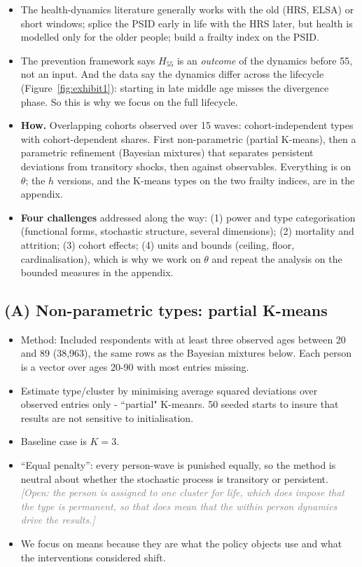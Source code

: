 \documentclass[11pt]{article}
\newcommand{\note}[1]{\textcolor{gray}{\textit{[#1]}}}
\begin{document}
	\begin{itemize}
		\item The health-dynamics literature generally works with the old (HRS, ELSA) or short windows; \citet{denardi2025} splice the PSID early in life with the HRS later, but health is modelled only for the older people; \citet{hosseini2022} build a frailty index on the PSID. 
		\item The prevention framework says $H_{55}$ is an \emph{outcome} of the dynamics before 55, not an input. And the data say the dynamics differ across the lifecycle (Figure~\ref{fig:exhibit1}): starting in late middle age misses the divergence phase. So this is why we focus on the full lifecycle.
		\item \textbf{How.} Overlapping cohorts observed over 15 waves: cohort-independent types with cohort-dependent shares. First non-parametric (partial K-means), then a parametric refinement (Bayesian mixtures) that separates persistent deviations from transitory shocks, then against observables. Everything is on $\theta$; the $h$ versions, and the K-means types on the two frailty indices, are in the appendix.
		\item \textbf{Four challenges} addressed along the way: (1) power and type categorisation (functional forms, stochastic structure, several dimensions); (2) mortality and attrition; (3) cohort effects; (4) units and bounds (ceiling, floor, cardinalisation), which is why we work on $\theta$ and repeat the analysis on the bounded measures in the appendix.
	\end{itemize}
	
	\subsection{(A) Non-parametric types: partial K-means}
	
	\begin{itemize}
		\item Method: Included respondents with at least three observed ages between 20 and 89 (38,963), the same rows as the Bayesian mixtures below. Each person is a vector over ages 20-90 with most entries missing. 
		\item Estimate type/cluster by minimising average squared deviations over observed entries only - ``partial" K-meanrs. 50 seeded starts to insure that results are not sensitive to initialisation. 
		\item Baseline case is $K=3$. 
		\item ``Equal penalty'': every person-wave is punished equally, so the method is neutral about whether the stochastic process is transitory or persistent. \note{Open: the person is assigned to one cluster for life, which does impose that the type is permanent, so that does mean that the within person dynamics drive the results.}
		\item We focus on means because they are what the policy objects use and what the interventions considered shift.
	\end{itemize}
\end{document}
